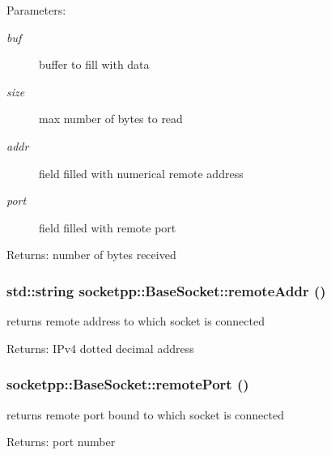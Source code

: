 \begin{CompactItemize}
\begin{Desc}
\item[Parameters:]
\begin{description}
\item[{\em buf}]buffer to fill with data \item[{\em size}]max number of bytes to read \item[{\em addr}]field filled with numerical remote address \item[{\em port}]field filled with remote port \end{description}
\end{Desc}
\begin{Desc}
\item[Returns:]number of bytes received \end{Desc}
\hypertarget{classsocketpp_1_1BaseSocket_483c6186ae60d0c399983e14f55af600}{
\subsubsection[{remoteAddr}]{\setlength{\rightskip}{0pt plus 5cm}std::string socketpp::BaseSocket::remoteAddr ()}}
\label{classsocketpp_1_1BaseSocket_483c6186ae60d0c399983e14f55af600}


returns remote address to which socket is connected 

\begin{Desc}
\item[Returns:]IPv4 dotted decimal address \end{Desc}
\hypertarget{classsocketpp_1_1BaseSocket_039db642444d2111f2f58ebe032c5f5f}{
\subsubsection[{remotePort}]{ socketpp::BaseSocket::remotePort ()}}
\label{classsocketpp_1_1BaseSocket_039db642444d2111f2f58ebe032c5f5f}


returns remote port bound to which socket is connected 

\begin{Desc}
\item[Returns:]port number \end{Desc}
\hypertarget{classsocketpp_1_1BaseSocket_fb896f016a243ddbb661acc7b05826bf}{
}
\end{CompactItemize}
